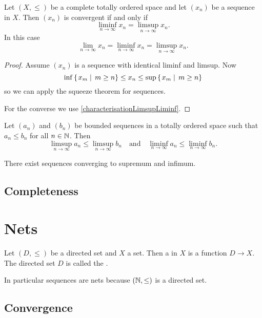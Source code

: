 \begin{proposition}
Let $(X,\leq)$ be a complete totally ordered space and let $(x_n)$ be a sequence in $X$. Then $(x_n)$ is convergent \textup{if and only if}
\[ \liminf_{n\to \infty} x_n = \limsup_{n\to \infty} x_n. \]
In this case
\[ \lim_{n\to \infty} x_n = \liminf_{n\to \infty} x_n = \limsup_{n\to \infty} x_n. \]
\end{proposition}
\begin{proof}
Assume $(x_n)$ is a sequence with identical liminf and limsup. Now
\[ \inf\left\{\left. x_m \;\right|\; m\geq n \right\} \leq x_n \leq \sup\left\{\left. x_m \;\right|\; m\geq n \right\} \]
so we can apply the squeeze theorem for sequences.

For the converse we use \ref{characterisationLimsupLiminf}.
\end{proof}

\begin{lemma} \label{monotonicityLimsupLiminf}
Let $(a_n)$ and $(b_n)$ be bounded sequences in a totally ordered space such that $a_n\leq b_n$ for all $n\in\mathbb{N}$. Then
\[ \limsup_{n\to \infty}a_n \leq \limsup_{n\to \infty}b_n \quad\text{and}\quad \liminf_{n\to \infty}a_n \leq \liminf_{n\to \infty}b_n. \]
\end{lemma}








\begin{lemma} \label{sequencesSupInf}
There exist sequences converging to supremum and infimum.
\end{lemma}

\subsection{Completeness}





\section{Nets}
\begin{definition}
Let $(D,\leq)$ be a directed set and $X$ a set. Then a  in $X$ is a function $D\to X$. The directed set $D$ is called the .
\end{definition}
In particular sequences are nets because $(\mathbb{N},\leq)$ is a directed set.
\subsection{Convergence}
\begin{definition}

\end{definition}

